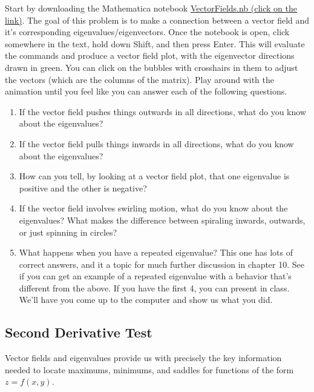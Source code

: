 \begin{problem}
Start by downloading the Mathematica notebook \href{https://www.dropbox.com/s/1df1nswgbq3y34n/316-VectorField.nb}{VectorFields.nb (click on the link)}.  The goal of this problem is to make a connection between a vector field and it's corresponding eigenvalues/eigenvectors. Once the notebook is open, click somewhere in the text, hold down Shift, and then press Enter.  This will evaluate the commands and produce a vector field plot, with the eigenvector directions drawn in green. You can click on the bubbles with crosshairs in them to adjust the vectors (which are the columns of the matrix). Play around with the animation until you feel like you can answer each of the following questions.
 \begin{enumerate}
  \item If the vector field pushes things outwards in all directions, what do you know about the eigenvalues?
  \item If the vector field pulls things inwards in all directions, what do you know about the eigenvalues?
  \item How can you tell, by looking at a vector field plot, that one eigenvalue is positive and the other is negative?
  \item If the vector field involves swirling motion, what do you know about the eigenvalues? What makes the difference between spiraling inwards, outwards, or just spinning in circles?
  \item What happens when you have a repeated eigenvalue? This one has lots of correct answers, and it a topic for much further discussion in chapter 10. See if you can get an example of a repeated eigenvalue with a behavior that's different from the above. If you have the first 4, you can present in class. We'll have you come up to the computer and show us what you did.
 \end{enumerate}
\end{problem}


\subsection{Second Derivative Test}

Vector fields and eigenvalues provide us with precisely the key information needed to locate maximums, minimums, and saddles for functions of the form $z=f(x,y)$. 

